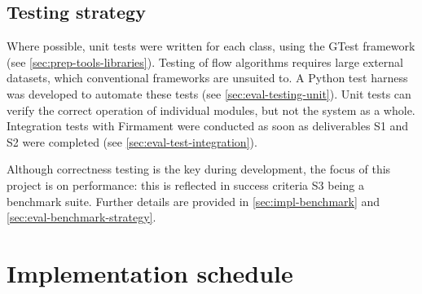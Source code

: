 
\subsection{Testing strategy}
\label{sec:prep-management-testing}
Where possible, unit tests were written for each class, using the GTest framework (see \cref{sec:prep-tools-libraries}). Testing of flow algorithms requires large external datasets, which conventional frameworks are unsuited to. A Python test harness was developed to automate these tests (see \cref{sec:eval-testing-unit}). Unit tests can verify the correct operation of individual modules, but not the system as a whole. Integration tests with Firmament were conducted as soon as deliverables S1 and S2 were completed (see \cref{sec:eval-test-integration}).    

Although correctness testing is the key during development, the focus of this project is on performance: this is reflected in success criteria S3 being a benchmark suite. Further details are provided in \cref{sec:impl-benchmark} and \cref{sec:eval-benchmark-strategy}.

\section{Implementation schedule} \label{sec:prep-implsched}

%


